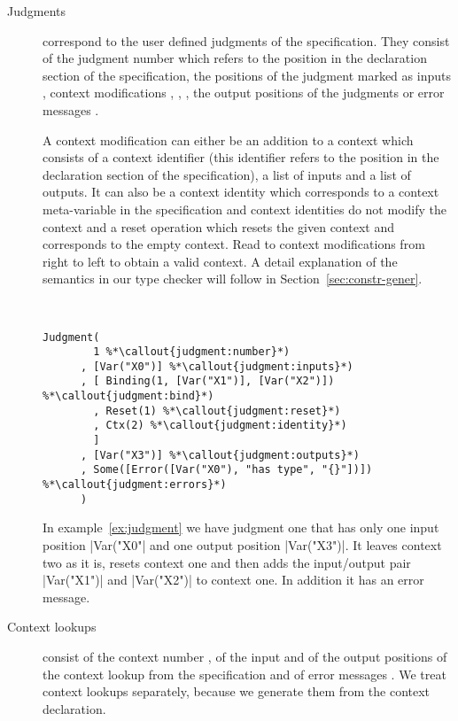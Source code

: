 \begin{description}
\item[Judgments] correspond to the user defined judgments of the
  specification. They consist of the judgment number
   which refers to the position in the
  declaration section of the specification, the positions of the
  judgment marked as inputs , context
  modifications ,
  , , the
  output positions of the judgments  or
  error messages .

  A context modification can either be an addition to a context
   which consists of a context identifier
  (this identifier refers to the position in the declaration section
  of the specification), a list of inputs and a list of outputs. It
  can also be a context identity  which
  corresponds to a context meta-variable in the specification and
  context identities do not modify the context and a reset operation
   which resets the given context and
  corresponds to the empty context. Read to context modifications from
  right to left to obtain a valid context. A detail explanation of the
  semantics in our type checker will follow in
  Section~\ref{sec:constr-gener}.

\begin{example}{~}
\begin{lstlisting}[language=sltc]
Judgment(
        1 %*\callout{judgment:number}*)
      , [Var("X0")] %*\callout{judgment:inputs}*)
      , [ Binding(1, [Var("X1")], [Var("X2")]) %*\callout{judgment:bind}*)
        , Reset(1) %*\callout{judgment:reset}*)
        , Ctx(2) %*\callout{judgment:identity}*)
        ]
      , [Var("X3")] %*\callout{judgment:outputs}*)
      , Some([Error([Var("X0"), "has type", "{}"])]) %*\callout{judgment:errors}*)
      )
\end{lstlisting}
\label{ex:judgment}
\end{example}

In example~\ref{ex:judgment} we have judgment one that has only one
input position \code|Var("X0"| and one output position
\code|Var("X3")|. It leaves context two as it is, resets context one
and then adds the input/output pair \code|Var("X1")| and
\code|Var("X2")| to context one. In addition it has an error message.

\item[Context lookups] consist of the context number
  , of the input  and
  of the output  positions of the context
  lookup from the specification and of error messages
  . We treat context lookups separately,
  because we generate them from the context declaration.


\end{description}
